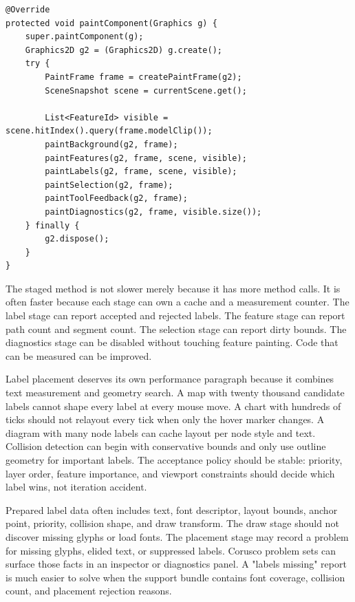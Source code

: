 \begin{lstlisting}[caption={A staged paint method for a rich visual component.}]
@Override
protected void paintComponent(Graphics g) {
    super.paintComponent(g);
    Graphics2D g2 = (Graphics2D) g.create();
    try {
        PaintFrame frame = createPaintFrame(g2);
        SceneSnapshot scene = currentScene.get();

        List<FeatureId> visible = scene.hitIndex().query(frame.modelClip());
        paintBackground(g2, frame);
        paintFeatures(g2, frame, scene, visible);
        paintLabels(g2, frame, scene, visible);
        paintSelection(g2, frame);
        paintToolFeedback(g2, frame);
        paintDiagnostics(g2, frame, visible.size());
    } finally {
        g2.dispose();
    }
}
\end{lstlisting}

The staged method is not slower merely because it has more method calls. It is often faster because each stage can own a cache and a measurement counter. The label stage can report accepted and rejected labels. The feature stage can report path count and segment count. The selection stage can report dirty bounds. The diagnostics stage can be disabled without touching feature painting. Code that can be measured can be improved.

Label placement deserves its own performance paragraph because it combines text measurement and geometry search. A map with twenty thousand candidate labels cannot shape every label at every mouse move. A chart with hundreds of ticks should not relayout every tick when only the hover marker changes. A diagram with many node labels can cache layout per node style and text. Collision detection can begin with conservative bounds and only use outline geometry for important labels. The acceptance policy should be stable: priority, layer order, feature importance, and viewport constraints should decide which label wins, not iteration accident.

Prepared label data often includes text, font descriptor, layout bounds, anchor point, priority, collision shape, and draw transform. The draw stage should not discover missing glyphs or load fonts. The placement stage may record a problem for missing glyphs, elided text, or suppressed labels. Corusco problem sets can surface those facts in an inspector or diagnostics panel. A "labels missing" report is much easier to solve when the support bundle contains font coverage, collision count, and placement rejection reasons.

